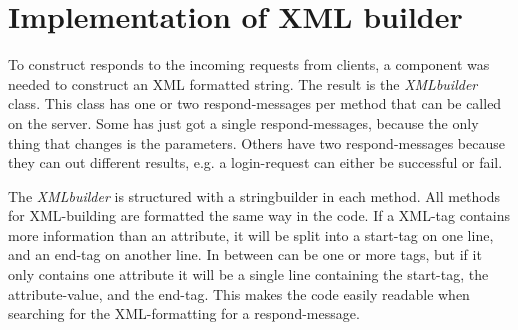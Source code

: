 \section{Implementation of XML builder}
\label{sec:xmlbuilderimpl}
To construct responds to the incoming requests from clients, a component was needed to construct an XML formatted string. The result is the \textit{XMLbuilder} class. This class has one or two respond-messages per method that can be called on the server. Some has just got a single respond-messages, because the only thing that changes is the parameters. Others have two respond-messages because they can out different results, e.g. a login-request can either be successful or fail. 

The \textit{XMLbuilder} is structured with a stringbuilder in each method. All methods for XML-building are formatted the same way in the code. If a XML-tag contains more information than an attribute, it will be split into a start-tag on one line, and an end-tag on another line. In between can be one or more tags, but if it only contains one attribute it will be a single line containing the start-tag, the attribute-value, and the end-tag. This makes the code easily readable when searching for the XML-formatting for a respond-message. 